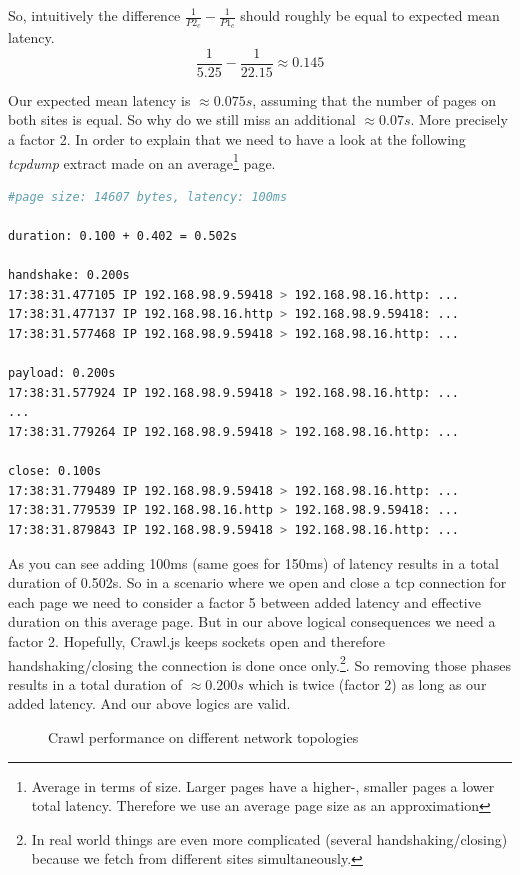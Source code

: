 So, intuitively the difference $ \frac{1}{P2_c} - \frac{1}{P1_c} $ should roughly be equal to expected mean latency.
\[ \frac{1}{5.25} - \frac{1}{22.15} \approx  0.145\]

Our expected mean latency is $ \approx 0.075s $, assuming that the number of pages on both sites is equal. So why do we still miss an additional $ \approx 0.07s $. More precisely a factor 2. In order to explain that we need to have a look at the following \emph{tcpdump} extract made on an average\footnote{Average in terms of size. Larger pages have a higher-, smaller pages a lower total latency. Therefore we use an average page size as an approximation} page.

\begin{lstlisting}[language=bash]
#page size: 14607 bytes, latency: 100ms

duration: 0.100 + 0.402 = 0.502s

handshake: 0.200s
17:38:31.477105 IP 192.168.98.9.59418 > 192.168.98.16.http: ...
17:38:31.477137 IP 192.168.98.16.http > 192.168.98.9.59418: ...
17:38:31.577468 IP 192.168.98.9.59418 > 192.168.98.16.http: ...

payload: 0.200s
17:38:31.577924 IP 192.168.98.9.59418 > 192.168.98.16.http: ...
...
17:38:31.779264 IP 192.168.98.9.59418 > 192.168.98.16.http: ...

close: 0.100s
17:38:31.779489 IP 192.168.98.9.59418 > 192.168.98.16.http: ...
17:38:31.779539 IP 192.168.98.16.http > 192.168.98.9.59418: ...
17:38:31.879843 IP 192.168.98.9.59418 > 192.168.98.16.http: ...
\end{lstlisting}

As you can see adding 100ms (same goes for 150ms) of latency results in a total duration of 0.502s. So in a scenario where we open and close a tcp connection for each page we need to consider a factor 5 between added latency and effective duration on this average page. But in our above logical consequences we need a factor 2. Hopefully, Crawl.js keeps sockets open and therefore handshaking/closing the connection is done once only.\footnote{In real world things are even more complicated (several handshaking/closing) because we fetch from different sites simultaneously.}. So removing those phases results in a total duration of $ \approx 0.200s $ which is twice (factor 2) as long as our added latency. And our above logics are valid.

\begin{figure}
  \centering
  \caption{Crawl performance on different network topologies}
  \label{plot:exp_002}
\end{figure}

